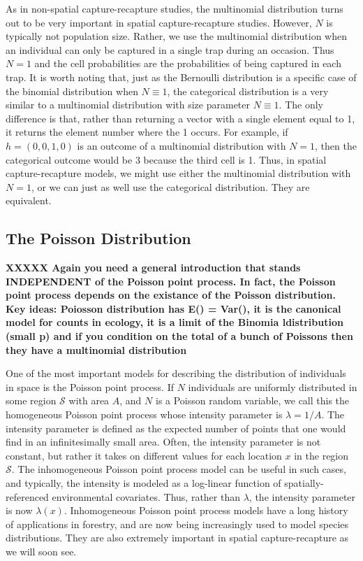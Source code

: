 As in non-spatial capture-recapture studies, the multinomial
distribution turns out to be very important in spatial
capture-recapture studies. However, $N$ is typically not population
size. Rather, we use the multinomial distribution when an individual
can only be captured in a single trap during an occasion. Thus
$N=1$ and the cell probabilities are the probabilities of
being captured in each trap.
It is worth noting that, just as the Bernoulli distribution is a specific case of the binomial
distribution when $N \equiv 1$, the categorical distribution is a very
similar to a multinomial distribution with size parameter
$N\equiv1$. The only difference is that, rather than returning a
vector with a single element equal to 1, it returns the element number
where the 1 occurs. For example, if $h=(0,0,1,0)$ is an outcome of a
multinomial distribution with $N=1$, then the categorical outcome
would be 3 because the third cell is 1. Thus, in spatial
capture-recapture models, we might use either the multinomial
distribution with $N=1$, or we can just as well use the categorical
distribution. They are equivalent.


\subsection{The Poisson Distribution}

{\bf XXXXX Again you need a general introduction that stands
  INDEPENDENT of the Poisson point process. In fact, the Poisson point
  process depends on the existance of the Poisson distribution. Key
  ideas:
Poiosson distribution has E() = Var(), it is the canonical model for
counts in ecology, it is a limit of the Binomia ldistribution (small
p) and if you condition on the total of a bunch of Poissons then they
have a multinomial distribution
}



One of the most important models for describing the distribution
of individuals in space is the Poisson point
process. If $N$ individuals are uniformly distributed in some region
$\mathcal{S}$ with area $A$, and $N$ is a Poisson
random variable, we call this the homogeneous Poisson point process
whose intensity parameter is $\lambda = 1/A$. The intensity parameter
is defined as the expected number of points that one would find in an
infinitesimally small area. Often, the intensity parameter is not
constant, but rather it takes on different values for each location
$x$ in the region $\mathcal{S}$. The inhomogeneous Poisson point
process model can be useful in such cases, and typically, the
intensity is modeled as a log-linear function of spatially-referenced
environmental covariates. Thus, rather than $\lambda$, the intensity
parameter is now $\lambda(x)$. Inhomogeneous Poisson point process
models have a long history of applications in forestry, and are now
being increasingly used to model species distributions. They are also
extremely important in spatial capture-recapture as we will soon see.

